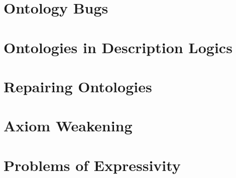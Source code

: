 \section{Ontology Bugs}



\section{Ontologies in Description Logics}



\section{Repairing Ontologies}



\section{Axiom Weakening}



\section{Problems of Expressivity}


